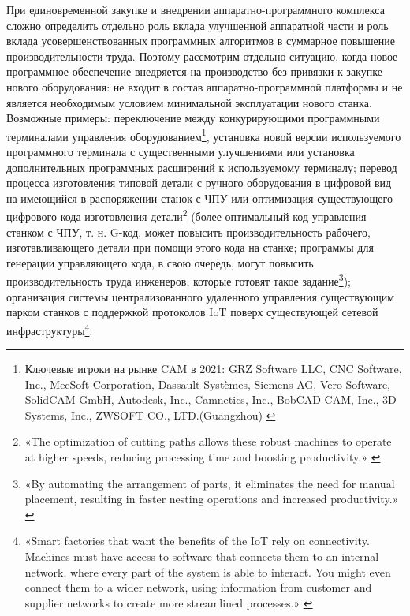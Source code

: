 \documentclass{article}
\begin{document}
При единовременной закупке и внедрении аппаратно-программного комплекса сложно определить отдельно роль вклада улучшенной аппаратной части и роль вклада усовершенствованных программных алгоритмов в суммарное повышение производительности труда. Поэтому рассмотрим отдельно ситуацию, когда новое программное обеспечение внедряется на производство без привязки к закупке нового оборудования: не входит в состав аппаратно-программной платформы и не является необходимым условием минимальной эксплуатации нового станка. Возможные примеры: переключение между конкурирующими программными терминалами управления оборудованием\footnote{Ключевые игроки на рынке CAM в 2021: GRZ Software LLC, CNC Software, Inc., MecSoft Corporation, Dassault Systèmes, Siemens AG, Vero Software, SolidCAM GmbH, Autodesk, Inc., Camnetics, Inc., BobCAD-CAM, Inc., 3D Systems, Inc., ZWSOFT CO., LTD.(Guangzhou) \cite{camMarketStatus2021}}, установка новой версии используемого программного терминала с существенными улучшениями или установка дополнительных программных расширений к используемому терминалу; перевод процесса изготовления типовой детали с ручного оборудования в цифровой вид на имеющийся в распоряжении станок с ЧПУ или оптимизация существующего цифрового кода изготовления детали\footnote{«The optimization of cutting paths allows these robust machines to operate at higher speeds, reducing processing time and boosting productivity.» \cite{nestingSoftOverview}} (более оптимальный код управления станком с ЧПУ, т. н. G-код, может повысить производительность рабочего, изготавливающего детали при помощи этого кода на станке; программы для генерации управляющего кода, в свою очередь, могут повысить производительность труда инженеров, которые готовят такое задание\footnote{«By automating the arrangement of parts, it eliminates the need for manual placement, resulting in faster nesting operations and increased productivity.» \cite{autodeskNesting}}); организация системы централизованного удаленного управления существующим парком станков с поддержкой протоколов IoT поверх существующей сетевой инфраструктуры\footnote{«Smart factories that want the benefits of the IoT rely on connectivity. Machines must have access to software that connects them to an internal network, where every part of the system is able to interact. You might even connect them to a wider network, using information from customer and supplier networks to create more streamlined processes.» \cite{iotCncFactory}}.
\end{document}
